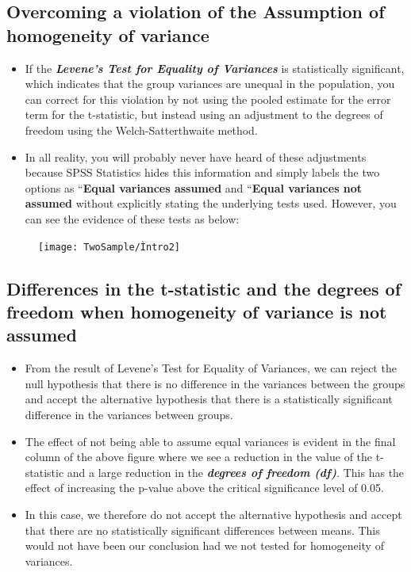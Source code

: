 \documentclass[]{article}
\begin{document}
\subsection{Overcoming a violation of the Assumption of homogeneity of variance}
\begin{itemize}
	\item If the \textbf{\textit{Levene's Test for Equality of Variances}} is statistically significant, which indicates that the group variances are unequal in the population, you can correct for this violation by not using the pooled estimate for the error term for the t-statistic, but instead using an adjustment to the degrees of freedom using the Welch-Satterthwaite method. 
	\item In all reality, you will probably never have heard of these adjustments because SPSS Statistics hides this information and simply labels the two options as ``\textbf{Equal variances assumed} and ``\textbf{Equal variances not assumed} without explicitly stating the underlying tests used. However, you can see the evidence of these tests as below:
\end{itemize}
\begin{figure}[h!]
\centering
\texttt{[image: TwoSample/Ìntro2]}

\label{fig:intro2}
\end{figure}

\subsection{Differences in the t-statistic and the degrees of freedom when homogeneity of variance is not assumed}
\begin{itemize}
	\item From the result of Levene's Test for Equality of Variances, we can reject the null hypothesis that there is no difference in the variances between the groups and accept the alternative hypothesis that there is a statistically significant difference in the variances between groups. 
	\item The effect of not being able to assume equal variances is evident in the final column of the above figure where we see a reduction in the value of the t-statistic and a large reduction in the \textit{\textbf{degrees of freedom (df)}}. This has the effect of increasing the p-value above the critical significance level of 0.05. \item In this case, we therefore do not accept the alternative hypothesis and accept that there are no statistically significant differences between means. This would not have been our conclusion had we not tested for homogeneity of variances.
\end{itemize}
\end{document}
